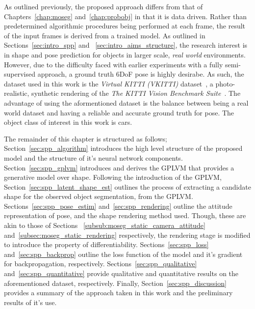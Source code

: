 As outlined previously, the proposed approach differs from that of Chapters~\ref{chap:moseg} and~\ref{chap:probobj} 
in that it is data driven. Rather than predetermined algorithmic procedures being performed at each frame, the 
result of the input frames is derived from a trained model. As outlined in Sections~\ref{sec:intro_spp} and
~\ref{sec:intro_aims_structure}, the research interest is in shape and pose prediction for objects in larger scale, 
\textit{real world} environments. However, due to the difficulty faced with earlier experiments with a fully semi-supervised 
approach, a ground truth 6DoF pose is highly desirabe. As such, the dataset used in this work is the \textit{Virtual KITTI (VKITTI)} 
dataset~\cite{Gaidon2016}, a photo-realistic, synthetic rendering of the \textit{The KITTI Vision Benchmark Suite}~\cite{Geiger2013,Menze2015,Geiger2012}. 
The advantage of using the aformentioned dataset is the balance between being a real world dataset and having a reliable and 
accurate ground truth for pose. The object class of interest in this work is cars.

The remainder of this chapter is structured as follows; Section~\ref{sec:spp_algorithm} introduces the high level 
structure of the proposed model and the structure of it's neural network components. Section~\ref{sec:spp_gplvm} 
introduces and derives the GPLVM that provides a generative model over shape. Following the introduction 
of the GPLVM, Section~\ref{sec:spp_latent_shape_est} outlines the process of extracting a candidate shape for the observed 
object segmentation, from the GPLVM\@. Sections~\ref{sec:spp_pose_estim} and~\ref{sec:spp_rendering} outline the attitude 
representation of pose, and the shape rendering method used. Though, these are akin to those of Sections
~\ref{subsub:moseg_static_camera_attitude} and~\ref{subsec:moseg_static_rendering} respectively, the rendering stage is 
modified to introduce the property of differentiability. Sections~\ref{sec:spp_loss} and~\ref{sec:spp_backprop} 
outline the loss function of the model and it's gradient for backpropagation, respectively. Sections~\ref{sec:spp_qualitative} 
and~\ref{sec:spp_quantitative} provide qualitative and quantitative results on the aforementioned dataset, respectively. 
Finally, Section~\ref{sec:spp_discussion} provides a summary of the approach taken in this work and the preliminary results 
of it's use.

